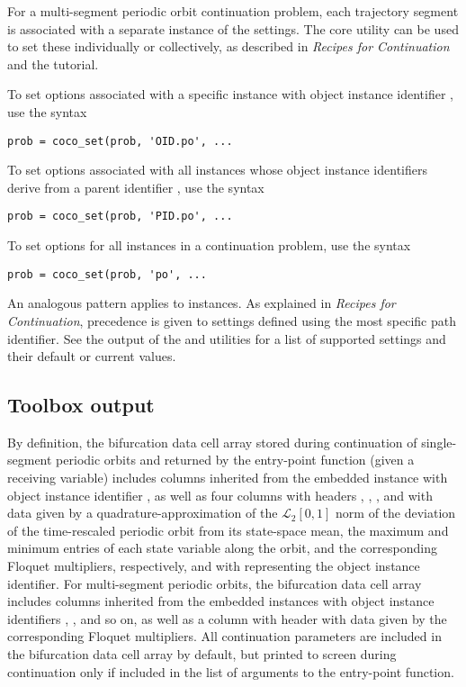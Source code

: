 For a multi-segment periodic orbit continuation problem, each trajectory segment is associated with a separate instance of the  settings. The  core utility can be used to set these individually or collectively, as described in \emph{Recipes for Continuation} and the  tutorial.

To set options associated with a specific  instance with object instance identifier , use the syntax
\begin{lstlisting}[language=coco-highlight]
prob = coco_set(prob, 'OID.po', ...
\end{lstlisting}
To set options associated with all  instances whose object instance identifiers derive from a parent identifier , use the syntax
\begin{lstlisting}[language=coco-highlight]
prob = coco_set(prob, 'PID.po', ...
\end{lstlisting}
To set options for all  instances in a continuation problem, use the syntax 
\begin{lstlisting}[language=coco-highlight]
prob = coco_set(prob, 'po', ...
\end{lstlisting}
An analogous pattern applies to  instances. As explained in \emph{Recipes for Continuation}, precedence is given to settings defined using the most specific path identifier. See the output of the  and  utilities for a list of supported settings and their default or current values.

\subsection{Toolbox output}
By definition, the bifurcation data cell array stored during continuation of single-segment periodic orbits and returned by the  entry-point function (given a receiving variable) includes columns inherited from the embedded  instance with object instance identifier , as well as four columns with headers , , , and  with data given by a quadrature-approximation of the $\mathcal{L}_2[0,1]$ norm of the deviation of the time-rescaled periodic orbit from its state-space mean, the maximum and minimum entries of each state variable along the orbit, and the corresponding Floquet multipliers, respectively, and with  representing the  object instance identifier. For multi-segment periodic orbits, the bifurcation data cell array includes columns inherited from the embedded  instances with object instance identifiers , , and so on, as well as a column with header   with data given by the corresponding Floquet multipliers. All continuation parameters are included in the bifurcation data cell array by default, but printed to screen during continuation only if included in the list of arguments to the  entry-point function.

